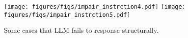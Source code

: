 \begin{figure*}[t]
\centering
\texttt{[image: figures/figs/impair\_instrction4.pdf]}  
\texttt{[image: figures/figs/impair\_instrction5.pdf]}  
\vspace{-10pt}
\caption{Some cases that LLM fails to response structurally.}
\label{fig:impair_structure}
\end{figure*}